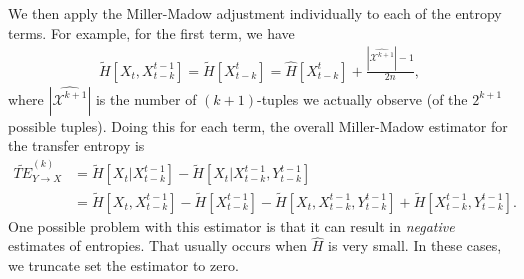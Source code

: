 	We then apply the Miller-Madow adjustment individually to each of the entropy terms. For example, for the first term, we have
	\begin{align}
		\tilde{H}[X_{t}, X_{t - k}^{t-1}] = \tilde{H}[X_{t - k}^{t}] = \hat{H}[X_{t-k}^{t}] + \frac{|\widehat{\mathcal{X}^{k+1}}| - 1}{2n},
	\end{align}
	where $|\widehat{\mathcal{X}^{k+1}}|$ is the number of $(k + 1)$-tuples we actually observe (of the $2^{k + 1}$ possible tuples). Doing this for each term, the overall Miller-Madow estimator for the transfer entropy is
	\begin{align}
		\widetilde{TE}_{Y \to X}^{(k)} &= \tilde{H}[X_t | X_{t-k}^{t-1}] - \tilde{H}[X_t | X_{t-k}^{t-1},Y_{t-k}^{t-1}] \\ 
		&= \tilde{H}[X_t,X_{t-k}^{t-1}]-\tilde{H}[X_{t-k}^{t-1}]-\tilde{H}[X_t,X_{t-k}^{t-1},Y_{t-k}^{t-1}]+\tilde{H}[X_{t-k}^{t-1},Y_{t-k}^{t-1}].
	\end{align}
	One possible problem with this estimator is that it can result in \emph{negative} estimates of entropies. That usually occurs when $\hat{H}$ is very small. In these cases, we truncate set the estimator to zero.


